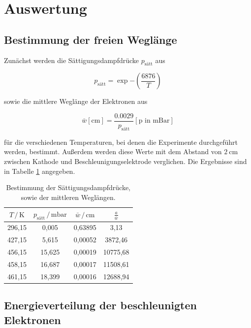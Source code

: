 \section{Auswertung}
\label{sec:Auswertung}

\subsection{Bestimmung der freien Weglänge}

Zunächst werden die Sättigungsdampfdrücke $p_\text{sätt}$ aus

\begin{equation*}
p_\text{sätt} = \exp{-\left(\frac{6876}{T}\right)}
\end{equation*}

sowie die mittlere Weglänge der Elektronen aus 

\begin{equation*}
\bar{w}[\text{cm}] = \frac{\num{0.0029}}{p_\text{sätt}}[\text{p in mBar}]
\end{equation*}

für die verschiedenen Temperaturen, bei denen die Experimente durchgeführt
werden, bestimmt. Außerdem werden diese Werte mit dem Abstand von $\SI{2}{\centi\meter}$ zwischen Kathode
und Beschleunigungselektrode verglichen. Die Ergebnisse sind in Tabelle \ref{tab:weg} angegeben. 

\begin{table}
  \centering
  \caption{Bestimmung der Sättigungsdampfdrücke, sowie der mittleren Weglängen.}
  \label{tab:weg}
  \begin{tabular}{c c c c}
  \toprule
  $ T \,/\, \si{\kelvin} $ & $ p_\text{sätt} \,/\, \si{\milli\bar} $ & $\bar{w} \,/\, \si{\centi\meter}$ & $\frac{a}{\bar{w}}$\\
  \midrule 
  296,15 &  0,005 & 0,63895 &     3,13\\
  427,15 &  5,615 & 0,00052 &  3872,46\\
  456,15 & 15,625 & 0,00019 & 10775,68\\
  458,15 & 16,687 & 0,00017 & 11508,61\\
  461,15 & 18,399 & 0,00016 & 12688,94\\
  \bottomrule
  \end{tabular}
  \end{table}

\subsection{Energieverteilung der beschleunigten Elektronen}

